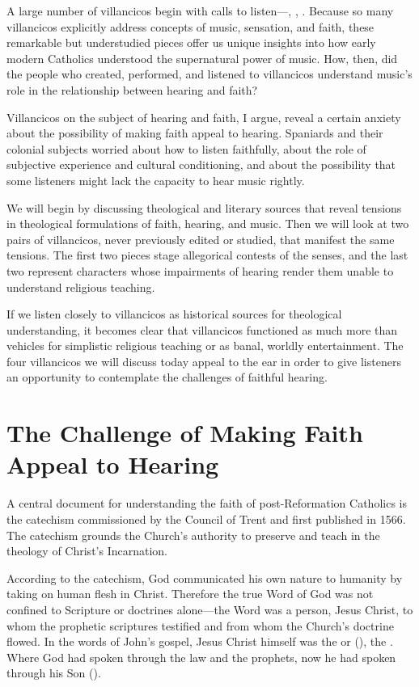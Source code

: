 A large number of villancicos begin with calls to listen---, , .
Because so many villancicos explicitly address concepts of music, sensation, and faith, these remarkable but understudied pieces offer us unique insights into how early modern Catholics understood the supernatural power of music.
How, then, did the people who created, performed, and listened to villancicos understand music's role in the relationship between hearing and faith?

Villancicos on the subject of hearing and faith, I argue, reveal a certain anxiety about the possibility of making faith appeal to hearing.
Spaniards and their colonial subjects worried about how to listen faithfully, about the role of subjective experience and cultural conditioning, and about the possibility that some listeners might lack the capacity to hear music rightly.

We will begin by discussing theological and literary sources that reveal tensions in theological formulations of faith, hearing, and music.
Then we will look at two pairs of villancicos, never previously edited or studied, that manifest the same tensions.
The first two pieces stage allegorical contests of the senses, and the last two represent characters whose impairments of hearing render them unable to understand religious teaching.

If we listen closely to villancicos as historical sources for theological understanding, it becomes clear that villancicos functioned as much more than vehicles for simplistic religious teaching or as banal, worldly entertainment.
The four villancicos we will discuss today appeal to the ear in order to give listeners an opportunity to contemplate the challenges of faithful hearing.

\section{The Challenge of Making Faith Appeal to Hearing}

A central document for understanding the faith of post-Reformation Catholics is the catechism  commissioned by the Council of Trent and first published in 1566.%
\Autocites{Catholic:Catechismus1614}[]{NewCatholic}
The catechism grounds the Church's authority to preserve and teach  in the theology of Christ's Incarnation.

According to the catechism, God communicated his own nature to humanity by taking on human flesh in Christ.
Therefore the true Word of God was not confined to Scripture or doctrines alone---the Word was a person, Jesus Christ, to whom the prophetic scriptures testified and from whom the Church's doctrine flowed.
In the words of John's gospel, Jesus Christ himself was the  or  (), the .
Where God had spoken through the law and the prophets, now he had spoken through his Son ().

